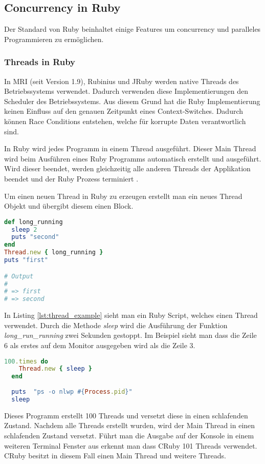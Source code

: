 \subsection{Concurrency in Ruby}
Der Standard von Ruby beinhaltet einige Features um concurrency und paralleles Programmieren zu ermöglichen.

\subsubsection{Threads in Ruby}
In MRI (seit Version 1.9), Rubinius und JRuby werden native Threads des Betriebssystems verwendet. Dadurch verwenden diese Implementierungen den Scheduler des Betriebssystems. Aus diesem Grund hat die Ruby Implementierung keinen Einfluss auf den genauen Zeitpunkt eines Context-Switches. Dadurch können Race Conditions entstehen, welche für korrupte Daten verantwortlich sind.

In Ruby wird jedes Programm in einem Thread ausgeführt. Dieser Main Thread wird beim Ausführen eines Ruby Programms automatisch erstellt und ausgeführt. Wird dieser beendet, werden gleichzeitig alle anderen Threads der Applikation beendet und der Ruby Prozess terminiert \cite[p. 15]{Sto2013}.

Um einen neuen Thread in Ruby zu erzeugen erstellt man ein neues Thread Objekt und übergibt diesem einen Block. 

\begin{lstlisting}[language=Ruby,label=lst:thread_example]
def long_running
  sleep 2
  puts "second"
end
Thread.new { long_running }
puts "first"

# Output
#
# => first
# => second

\end{lstlisting}

In Listing \ref{lst:thread_example} sieht man ein Ruby Script, welches einen Thread verwendet. Durch die Methode \emph{sleep} wird die Ausführung der Funktion \textit{long\_run\_running} zwei Sekunden gestoppt. Im Beispiel sieht man dass die Zeile 6 als erstes auf dem Monitor ausgegeben wird als die Zeile 3. 

\begin{lstlisting}[language=Ruby,caption=Adaptiert von \cite{Sto2013}]
  100.times do
    Thread.new { sleep }
  end
  
  puts  "ps -o nlwp #{Process.pid}"
  sleep
\end{lstlisting} 

Dieses Programm erstellt 100 Threads und versetzt diese in einen schlafenden Zustand. Nachdem alle Threads erstellt wurden, wird der Main Thread in einen schlafenden Zustand versetzt. Führt man die Ausgabe auf der Konsole in einem weiteren Terminal Fenster aus erkennt man dass CRuby 101 Threads verwendet. CRuby besitzt in diesem Fall einen Main Thread und weitere Threads.

